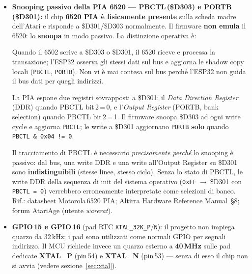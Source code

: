\documentclass[12pt, a4paper]{article}
\begin{document}
\begin{itemize}
  \item \textbf{Snooping passivo della PIA 6520 — PBCTL\,(\$D303) e PORTB\,(\$D301):}
  il chip \textbf{6520 PIA è fisicamente presente} sulla scheda madre dell'Atari e
  risponde a \$D301/\$D303 normalmente. Il firmware \textbf{non emula} il 6520: lo
  \textbf{snoopa} in modo passivo. La distinzione operativa è:

  \begin{center}
  \end{center}

  Quando il 6502 scrive a \$D303 o \$D301, il 6520 riceve e processa la transazione;
  l'ESP32 osserva gli stessi dati sul bus e aggiorna le shadow copy locali
  (\texttt{PBCTL}, \texttt{PORTB}). Non vi è mai contesa sul bus perché l'ESP32 non
  guida il bus dati per quegli indirizzi.

  La PIA espone due registri sovrapposti a \$D301:
  il \emph{Data Direction Register} (DDR) quando PBCTL bit\,2\,=\,0,
  e l'\emph{Output Register} (PORTB, bank selection) quando PBCTL bit\,2\,=\,1.
  Il firmware snoopa \$D303 ad ogni write cycle e aggiorna \texttt{PBCTL};
  le write a \$D301 aggiornano \texttt{PORTB} \textbf{solo} quando
  \texttt{PBCTL\,\&\,0x04\,!=\,0}.

  Il tracciamento di PBCTL è necessario \emph{precisamente perché} lo snooping è
  passivo: dal bus, una write DDR e una write all'Output Register su \$D301 sono
  \textbf{indistinguibili} (stesse linee, stesso ciclo). Senza lo stato di PBCTL,
  le write DDR della sequenza di init del sistema operativo
  (\texttt{0xFF}~→~\$D301 con \texttt{PBCTL\,=\,0}) verrebbero erroneamente
  interpretate come selezioni di banco.
  Rif.: datasheet Motorola\,6520 PIA; Altirra Hardware Reference Manual~\S8;
  forum AtariAge (utente \textit{warerat}).

  \item \textbf{GPIO\,15 e GPIO\,16} (pad RTC \texttt{XTAL\_32K\_P}/\texttt{N}): il progetto non impiega quarzo da 32\,kHz; i pad sono utilizzati come normali GPIO per segnali indirizzo. Il MCU richiede invece un quarzo esterno a \textbf{40\,MHz} sulle pad dedicate \textbf{XTAL\_P} (pin\,54) e \textbf{XTAL\_N} (pin\,53) — senza di esso il chip non si avvia (vedere sezione~\ref{sec:xtal}).
\end{itemize}
\end{document}
